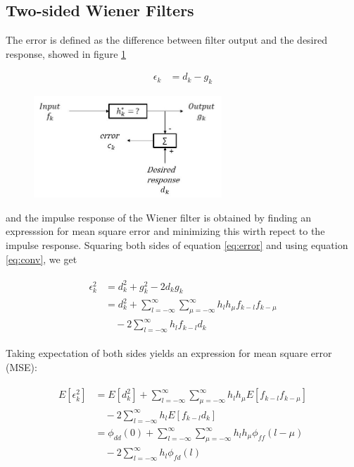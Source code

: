 \documentclass[8pt,a4paper]{article}
\begin{document}
\begin{multicols}{2}
\subsection*{Two-sided Wiener Filters}

The error is defined as the difference between filter output and the desired response, showed in figure \ref{fig:wiener}

\begin{align}
  \label{eq:error}
  \epsilon_{k} &= d_{k} - g_{k}
\end{align}


\begin{figure}[H]
  \begin{center}
      \includegraphics[width=200pt]{./Figures/wiener.jpg}
      \caption{}
      \label{fig:wiener}
  \end{center}
\end{figure}


and the impulse response of the Wiener filter is obtained by finding an expresssion for mean square error and minimizing this wirth repect to the impulse response. 
Squaring both sides of equation \ref{eq:error} and using equation \ref{eq:conv}, we get

\begin{align}
  \begin{split}
    \epsilon_{k}^{2}&= d_{k}^{2} + g_{k}^{2} -2d_{k}g_{k} \\
    &= d_{k}^{2} + \sum_{l=-\infty}^{\infty} \sum_{\mu=-\infty}^{\infty} h_{l}h_{\mu}f_{k-l}f_{k-\mu} \\ 
    &\quad -2 \sum_{l=-\infty}^{\infty} h_{l}f_{k-l}d_{k}
  \end{split}
\end{align}

Taking expectation of both sides yields an expression for mean square error (MSE):

\begin{align}
  \begin{split}
      E \left[ \epsilon_{k}^{2} \right] &= E \left[ d_{k}^{2} \right] + \sum_{l=-\infty}^{\infty} \sum_{\mu=-\infty}^{\infty} h_{l} h_{\mu}  E \left[ f_{k-l} f_{k-\mu} \right] \\ 
      &\quad  -2 \sum_{l=-\infty}^{\infty} h_{l} E \left[ f_{k-l} d_{k}  \right] \\
      &= \phi_{dd}(0) + \sum_{l=-\infty}^{\infty} \sum_{\mu=-\infty}^{\infty} h_{l}h_{\mu} \phi_{ff}(l-\mu) \\
      &\quad  -2 \sum_{l=-\infty}^{\infty} h_{l}\phi_{fd}(l)
  \end{split}
\end{align}


\end{multicols}
\end{document}
